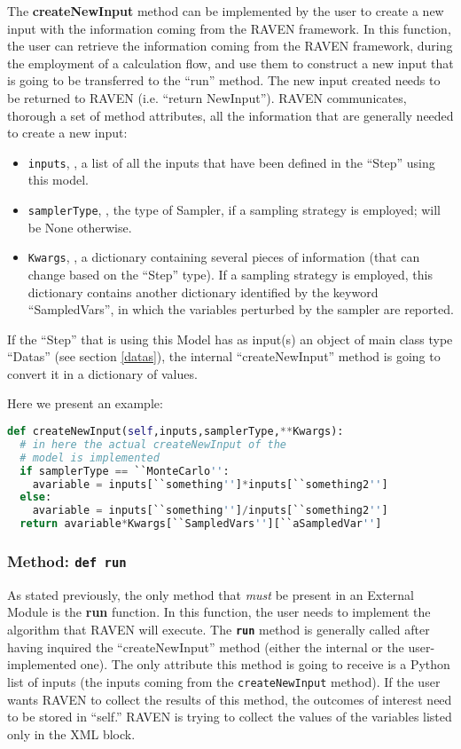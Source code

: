 The \textbf{createNewInput} method can be implemented by the user to create a
new input with the information coming from the RAVEN framework.
%
In this function, the user can retrieve the information coming from the RAVEN
framework, during the employment of a calculation flow, and use them to
construct a new input that is going to be transferred to the ``run'' method.
%
The new input created needs to be returned to RAVEN (i.e. ``return NewInput'').
%
RAVEN communicates, thorough a set of method attributes, all the information
that are generally needed to create a new input:
\begin{itemize}
  \item \texttt{inputs}, , a list of all the inputs that
  have been defined in the ``Step'' using this model.
  \item \texttt{samplerType}, , the type of Sampler, if a
  sampling strategy is employed; will be None otherwise.
  \item \texttt{Kwargs}, , a dictionary containing several
  pieces of information (that can change based on the ``Step'' type).
  If a sampling strategy is employed, this dictionary contains another
  dictionary identified by the keyword ``SampledVars'', in which the variables
  perturbed by the sampler are reported.
\end{itemize}
\nb If the ``Step'' that is using this Model has as input(s) an object of main
class type ``Datas'' (see section \ref{datas}), the internal ``createNewInput''
method is going to convert it in a dictionary of values.
%

Here we present an example:
\begin{lstlisting}[language=python]
def createNewInput(self,inputs,samplerType,**Kwargs):
  # in here the actual createNewInput of the
  # model is implemented
  if samplerType == ``MonteCarlo'':
    avariable = inputs[``something'']*inputs[``something2'']
  else:
    avariable = inputs[``something'']/inputs[``something2'']
  return avariable*Kwargs[``SampledVars''][``aSampledVar'']
\end{lstlisting}

\subsubsection{Method: \texttt{def run}}
\label{subsubsec:externalRun}
As stated previously, the only method that \emph{must} be present in an
External Module is the \textbf{run} function.
%
In this function, the user needs to implement the algorithm that RAVEN will
execute.
%
The \texttt{\textbf{run}} method is generally called after having inquired the
``createNewInput'' method (either the internal or the user-implemented one).
%
The only attribute this method is going to receive is a Python list of inputs
(the inputs coming from the \texttt{createNewInput} method).
%
If the user wants RAVEN to collect the results of this method, the outcomes of
interest need to be stored in ``self.''
%
\nb RAVEN is trying to collect the values of the variables listed only in the
 XML block.
%

